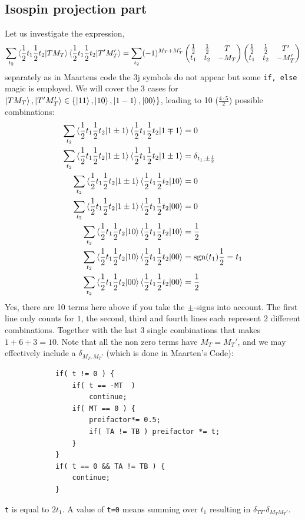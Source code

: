 \documentclass[10pt]{article}
\def\threej#1{\inthreej(#1)}
\def\inthreej(#1,#2,#3,#4,#5,#6){\begin{pmatrix}#1 & #2 & #3 \\ #4 & #5 & #6 \end{pmatrix}}
\begin{document}
\subsection{Isospin projection part}
Let us investigate the expression,
\begin{align*}
	\sum_{t_2} \braket{ \frac{1}{2} t_1 \frac{1}{2} t_2 | T M_T} \braket{ \frac{1}{2} t_1 \frac{1}{2} t_2 | T' M_T'} = \sum_{t_2} (-1)^{M_T + M_T' } \threej{ \frac{1}{2}, \frac{1}{2}, T, t_1,t_2, - M_T} \threej{ \frac{1}{2}, \frac{1}{2}, T', t_1,t_2, - M_T'}
\end{align*}
separately as in Maartens code the 3j symbols do not appear but some \texttt{if, else} magic is employed. We will cover the 3 cases for $\ket{ T M_T}, \ket{ T' M_T'} \in \{ \ket{1 1} , \ket{ 1 0 }, \ket{ 1 -1} , \ket{ 0 0} \}$, leading to 10 ($\frac{ 4 \cdot 5}{2}$) possible combinations:
\begin{align*}
	\sum_{t_2} \braket{ \frac{1}{2} t_1 \frac{1}{2} t_2 | 1 \pm 1} \braket{ \frac{1}{2} t_1 \frac{1}{2} t_2 | 1 \mp 1 } &= 
	0 \\
	\sum_{t_2} \braket{ \frac{1}{2} t_1 \frac{1}{2} t_2 | 1 \pm 1} \braket{ \frac{1}{2} t_1 \frac{1}{2} t_2 | 1 \pm 1 } &=
	\delta_{t_1,\pm \frac{1}{2}} \\
	\sum_{t_2} \braket{ \frac{1}{2} t_1 \frac{1}{2} t_2 | 1 \pm 1} \braket{ \frac{1}{2} t_1 \frac{1}{2} t_2 | 1  0 } &=
	0 \\
	\sum_{t_2} \braket{ \frac{1}{2} t_1 \frac{1}{2} t_2 | 1 \pm 1} \braket{ \frac{1}{2} t_1 \frac{1}{2} t_2 | 0  0 } &=
	0 \\
	\sum_{t_2} \braket{ \frac{1}{2} t_1 \frac{1}{2} t_2 | 1  0} \braket{ \frac{1}{2} t_1 \frac{1}{2} t_2 | 1  0 } &= 				\frac{1}{2} \\
	\sum_{t_2} \braket{ \frac{1}{2} t_1 \frac{1}{2} t_2 | 1  0} \braket{ \frac{1}{2} t_1 \frac{1}{2} t_2 | 0  0 } &=
	\text{sgn}(t_1) \frac{1}{2} = t_1 \\
	\sum_{t_2} \braket{ \frac{1}{2} t_1 \frac{1}{2} t_2 | 0  0} \braket{ \frac{1}{2} t_1 \frac{1}{2} t_2 | 0  0 } &=
	\frac{1}{2}
\end{align*}
Yes, there are 10 terms here above if you take the $\pm$-signs into account. The first line only counts for $1$, the second, third and fourth lines each represent $2$ different combinations. Together with the last $3$ single combinations that makes $ 1 + 6 + 3 = 10$. Note that all the non zero terms have $M_T=M_T'$, and we may effectively include a $\delta_{M_T,M_T'}$ (which is done in Maarten's Code):
\begin{verbatim}
            if( t != 0 ) {
                if( t == -MT  )
                    continue;
                if( MT == 0 ) {
                    preifactor*= 0.5;
                    if( TA != TB ) preifactor *= t;
                }
            }
            if( t == 0 && TA != TB ) {
                continue;
            }
\end{verbatim}
\texttt{t} is equal to $2 t_1$. A value of \texttt{t=0} means summing over $t_1$ resulting in $\delta_{T T'}\delta_{M_T M_T'}$.
\end{document}
